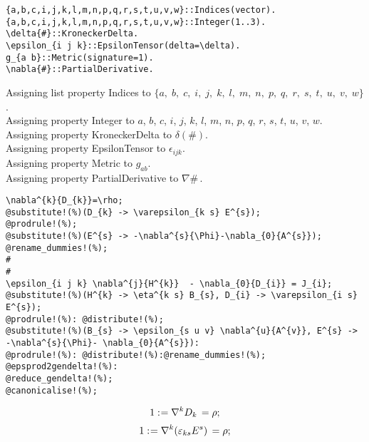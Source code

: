 \documentclass[11pt]{article}
\def\specialcolon{\mathrel{\mathop{:}}\hspace{-.5em}}
\begin{document}
{\color[named]{Blue}\begin{verbatim}
{a,b,c,i,j,k,l,m,n,p,q,r,s,t,u,v,w}::Indices(vector).
{a,b,c,i,j,k,l,m,n,p,q,r,s,t,u,v,w}::Integer(1..3).
\delta{#}::KroneckerDelta.
\epsilon_{i j k}::EpsilonTensor(delta=\delta).
g_{a b}::Metric(signature=1).
\nabla{#}::PartialDerivative.
\end{verbatim}}
Assigning list property Indices to $\{a,\; b,\; c,\; i,\; j,\; k,\; l,\; m,\; n,\; p,\; q,\; r,\; s,\; t,\; u,\; v,\; w\}$.
\\
Assigning property Integer to $a$, $b$, $c$, $i$, $j$, $k$, $l$, $m$, $n$, $p$, $q$, $r$, $s$, $t$, $u$, $v$, $w$.
\\
Assigning property KroneckerDelta to $\delta(\#)$.
\\
Assigning property EpsilonTensor to ${\epsilon}_{i j k}$.
\\
Assigning property Metric to ${g}_{a b}$.
\\
Assigning property PartialDerivative to $\nabla{\#}\, $.
\\
{\color[named]{Blue}\begin{verbatim}
\nabla^{k}{D_{k}}=\rho;
@substitute!(%)(D_{k} -> \varepsilon_{k s} E^{s});
@prodrule!(%);
@substitute!(%)(E^{s} -> -\nabla^{s}{\Phi}-\nabla_{0}{A^{s}});
@rename_dummies!(%);
#
#
\epsilon_{i j k} \nabla^{j}{H^{k}}  - \nabla_{0}{D_{i}} = J_{i};
@substitute!(%)(H^{k} -> \eta^{k s} B_{s}, D_{i} -> \varepsilon_{i s} E^{s});
@prodrule!(%): @distribute!(%);
@substitute!(%)(B_{s} -> \epsilon_{s u v} \nabla^{u}{A^{v}}, E^{s} -> -\nabla^{s}{\Phi}- \nabla_{0}{A^{s}}):
@prodrule!(%): @distribute!(%):@rename_dummies!(%);
@epsprod2gendelta!(%):
@reduce_gendelta!(%);
@canonicalise!(%);
\end{verbatim}}
\begin{dmath*}[compact, spread=2pt]
1\specialcolon{}= {\nabla}^{k}{{D}_{k}}\,  = \rho;
\end{dmath*}
\begin{dmath*}[compact, spread=2pt]
1\specialcolon{}= {\nabla}^{k}{({\varepsilon}_{k s} {E}^{s})}\,  = \rho;
\end{dmath*}
\end{document}
